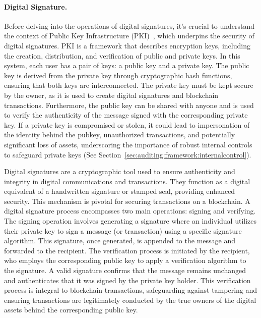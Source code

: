 \paragraph{Digital Signature.}\label{digital_signature}
Before delving into the operations of digital signatures, it's crucial to understand the context of Public Key Infrastructure (PKI)~\cite{adams1999understanding}, which underpins the security of digital signatures. PKI is a framework that describes encryption keys, including the creation, distribution, and verification of public and private keys. In this system, each user has a pair of keys: a public key and a private key. The public key is derived from the private key through cryptographic hash functions, ensuring that both keys are interconnected. The private key must be kept secure by the owner, as it is used to create digital signatures and blockchain transactions. Furthermore, the public key can be shared with anyone and is used to verify the authenticity of the message signed with the corresponding private key. If a private key is compromised or stolen, it could lead to impersonation of the identity behind the pubkey, unauthorized transactions, and potentially significant loss of assets, underscoring the importance of robust internal controls to safeguard private keys (See Section~\ref{sec:auditing:framework:internalcontrol}).

Digital signatures are a cryptographic tool used to ensure authenticity and integrity in digital communications and transactions. They function as a digital equivalent of a handwritten signature or stamped seal, providing enhanced security. This mechanism is pivotal for securing transactions on a blockchain. A digital signature process encompasses two main operations: signing and verifying. The signing operation involves generating a signature where an individual utilizes their private key to sign a message (or transaction) using a specific signature algorithm. This signature, once generated, is appended to the message and forwarded to the recipient. The verification process is initiated by the recipient, who employs the corresponding public key to apply a verification algorithm to the signature. A valid signature confirms that the message remains unchanged and authenticates that it was signed by the private key holder. This verification process is integral to blockchain transactions, safeguarding against tampering and ensuring transactions are legitimately conducted by the true owners of the digital assets behind the corresponding public key. 

